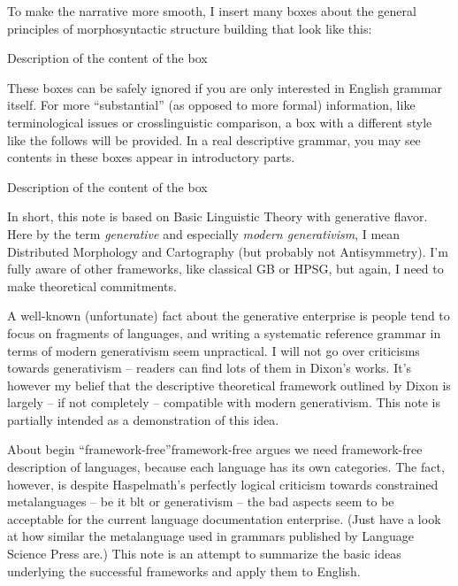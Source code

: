 \documentclass[UTF8, a4paper, oneside, scheme=plain]{ctexrep}
\newcommand*{\term}[1]{\emph{#1}}
\begin{document}
To make the narrative more smooth, 
I insert many boxes about the general principles of morphosyntactic structure building 
that look like this:
\begin{theorybox*}{Description of the content of the box}
\end{theorybox*}
\noindent These boxes can be safely ignored if you are only interested in English grammar itself.
For more ``substantial'' (as opposed to more formal) information,
like terminological issues or crosslinguistic comparison,
a box with a different style like the follows will be provided.
In a real descriptive grammar,
you may see contents in these boxes appear in introductory parts.

\begin{infobox*}{Description of the content of the box}
\end{infobox*}

In short, this note is based on Basic Linguistic Theory 
\citep{dixon2009basic1,dixon2010basic2,dixon2012basic3}
with generative flavor.
Here by the term \term{generative}
and especially \term{modern generativism}, 
I mean Distributed Morphology and Cartography
(but probably not Antisymmetry).
I'm fully aware of other frameworks,
like classical GB or HPSG, 
but again, I need to make theoretical commitments.

A well-known (unfortunate) fact about the generative enterprise is 
people tend to focus on fragments of languages,
and writing a systematic reference grammar in terms of modern generativism
seem unpractical.
I will not go over criticisms towards generativism -- 
readers can find lots of them in Dixon's works.
It's however my belief that the descriptive theoretical framework outlined by Dixon 
is largely -- if not completely -- compatible with modern generativism.
This note is partially intended as a demonstration of this idea.

\begin{theorybox}{About begin ``framework-free''}{framework-free}
    \citet{frameworkfree} argues we need framework-free description of languages,
    because each language has its own categories.
    The fact, however, is despite Haspelmath's perfectly logical criticism towards 
    constrained metalanguages -- be it \acl{blt} or generativism -- 
    the bad aspects seem to be acceptable for the current language documentation enterprise.
    (Just have a look at how similar the metalanguage used in grammars published by Language Science Press are.)
    This note is an attempt to summarize the basic ideas underlying 
    the successful frameworks and apply them to English.
\end{theorybox}
\end{document}
